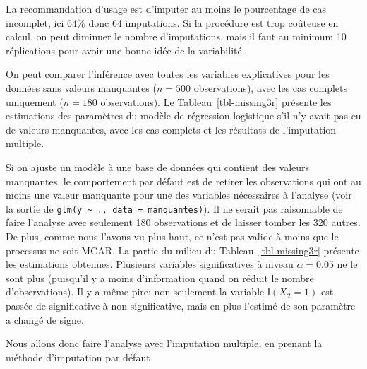 \documentclass[
  11pt,
  letterpaper,
]{book}
\theoremstyle{definition}
\theoremstyle{remark}
\begin{document}
La recommandation d'usage est d'imputer au moins le pourcentage de cas
incomplet, ici 64\% donc 64 imputations. Si la procédure est trop
coûteuse en calcul, on peut diminuer le nombre d'imputations, mais il
faut au minimum 10 réplications pour avoir une bonne idée de la
variabilité.

On peut comparer l'inférence avec toutes les variables explicatives pour
les données sans valeurs manquantes (\(n=500\) observations), avec les
cas complets uniquement (\(n=180\) observations). Le
Tableau~\ref{tbl-missing3r} présente les estimations des paramètres du
modèle de régression logistique s'il n'y avait pas eu de valeurs
manquantes, avec les cas complets et les résultats de l'imputation
multiple.

Si on ajuste un modèle à une base de données qui contient des valeurs
manquantes, le comportement par défaut est de retirer les observations
qui ont au moins une valeur manquante pour une des variables nécessaires
à l'analyse (voir la sortie de
\texttt{glm(y\ \textasciitilde{}\ .,\ data\ =\ manquantes)}). Il ne
serait pas raisonnable de faire l'analyse avec seulement 180
observations et de laisser tomber les 320 autres. De plus, comme nous
l'avons vu plus haut, ce n'est pas valide à moins que le processus ne
soit MCAR. La partie du milieu du Tableau~\ref{tbl-missing3r} présente
les estimations obtenues. Plusieurs variables significatives à niveau
\(\alpha=0.05\) ne le sont plus (puisqu'il y a moins d'information quand
on réduit le nombre d'observations). Il y a même pire: non seulement la
variable \(\mathsf{I}(X_2=1)\) est passée de significative à non
significative, mais en plus l'estimé de son paramètre a changé de signe.

Nous allons donc faire l'analyse avec l'imputation multiple, en prenant
la méthode d'imputation par défaut
\end{document}
